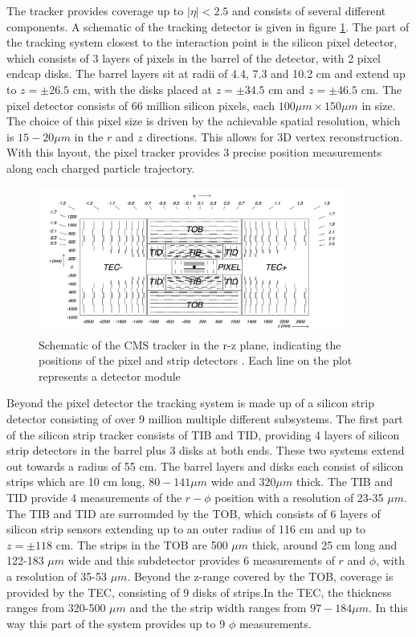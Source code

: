 The tracker provides coverage up to $|\eta| < 2.5$ and consists of
several different components. A schematic of the tracking detector is given
in figure \ref{fig:CMS_tracker}. The part of the tracking system
closest to the interaction point is the silicon pixel detector, which 
consists of 3 layers of pixels in the barrel of the detector, with 
2 pixel endcap disks. The barrel layers sit at radii of 4.4, 7.3 and 10.2 cm 
and extend up to $z=\pm 26.5$ cm, with the disks placed at $z=\pm 34.5$ cm and
$z=\pm 46.5$ cm. The pixel detector consists of 66 million silicon pixels, each
$100 \mu m \times 150 \mu m$ in size. The choice of this pixel size is driven
by the achievable spatial resolution, which is $15-20 \mu m$ in the $r$ and $z$ directions.
This allows for 3D vertex reconstruction. With this layout, the pixel tracker
provides 3 precise position measurements along each charged particle trajectory.


\begin{figure}[h!]
\begin{center}
\includegraphics[width=0.9\textwidth]{./Detector/Plots/Tracker.png}
\caption{Schematic of the CMS tracker in the r-z plane, indicating the
positions of the pixel and strip detectors \cite{cms-jinst}. Each line 
on the plot represents a detector module}
\label{fig:CMS_tracker}
\end{center}
\end{figure}


Beyond the pixel detector the tracking system is made up of a silicon
strip detector consisting of over 9 million multiple different subsystems. The first part of the
silicon strip tracker consists of \ac{TIB} and \ac{TID}, providing 4 layers of
silicon strip detectors in the barrel plus 3 disks at both ends. These two systems
extend out towards a radius of 55 cm. The barrel layers and disks each consist
of silicon strips which are 10 cm long, $80-141\mu m$ wide and $320 \mu m$ thick. The \ac{TIB} and \ac{TID}
provide 4 measurements of the $r-\phi$ position  with a resolution of 23-35 $\mu m$.
The \ac{TIB} and \ac{TID} are surrounded by the \ac{TOB}, which consists of 6 layers of silicon strip sensors extending
up to an outer radius of 116 cm and up to $z=\pm 118$ cm. The strips in the \ac{TOB} are 500 $\mu m$ thick, around 25 cm long and 122-183 $\mu m$ 
wide and this subdetector provides 6 measurements of $r$ and $\phi$, with a resolution
of 35-53 $\mu m$. Beyond the z-range covered by the \ac{TOB}, coverage is provided by the \ac{TEC},
consisting of 9 disks of strips.In the \ac{TEC}, the thickness ranges from 320-500 $\mu m$ and the the strip width ranges from $97-184 \mu m$.
In this way this part of the system provides up to 9 $\phi$ measurements.

